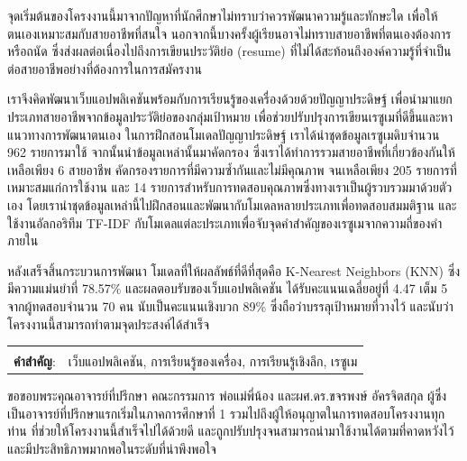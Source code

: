 \documentclass[12pt,oneside,openright,a4paper]{cpe-thai-project}
\begin{document}
\thaiabstract

จุดเริ่มต้นของโครงงานนี้มาจากปัญหาที่นักศึกษาไม่ทราบว่าควรพัฒนาความรู้และทักษะใด เพื่อให้ตนเองเหมาะสมกับสายอาชีพที่สนใจ 
นอกจากนี้บางครั้งผู้เรียนอาจไม่ทราบสายอาชีพที่ตนเองต้องการหรือถนัด ซึ่งส่งผลต่อเนื่องไปถึงการเขียนประวัติย่อ (resume) 
ที่ไม่ได้สะท้อนถึงองค์ความรู้ที่จำเป็นต่อสายอาชีพอย่างที่ต้องการในการสมัครงาน

เราจึงคิดพัฒนาเว็บแอปพลิเคชันพร้อมกับการเรียนรู้ของเครื่องด้วยด้วยปัญญาประดิษฐ์ เพื่อนำมาแยกประเภทสายอาชีพจากข้อมูลประวัติย่อของกลุ่มเป้าหมาย 
เพื่อช่วยปรับปรุงการเขียนเรซูเมที่ดีขึ้นและหาแนวทางการพัฒนาตนเอง ในการฝึกสอนโมเดลปัญญาประดิษฐ์ เราได้นำชุดข้อมูลเรซูเมดิบจำนวน 962 รายการมาใช้ 
จากนั้นนำข้อมูลเหล่านั้นมาคัดกรอง ซึ่งเราได้ทำการรวมสายอาชีพที่เกี่ยวข้องกันให้เหลือเพียง 6 สายอาชีพ คัดกรองรายการที่มีความซ้ำกันและไม่มีคุณภาพ 
จนเหลือเพียง 205 รายการที่เหมาะสมแก่การใช้งาน และ 14 รายการสำหรับการทดสอบคุณภาพซึ่งทางเราเป็นผู้รวบรวมมาด้วยตัวเอง 
โดยเรานำชุดข้อมูลเหล่านี้ไปฝึกสอนและพัฒนากับโมเดลหลายประเภทเพื่อทดสอบสมมติฐาน และใช้งานอัลกอริทึม TF-IDF 
กับโมเดลแต่ละประเภทเพื่อจับจุดคำสำคัญของเรซูเมจากความถี่ของคำภายใน

หลังเสร็จสิ้นกระบวนการพัฒนา โมเดลที่ให้ผลลัพธ์ที่ดีที่สุดคือ K-Nearest Neighbors (KNN) ซึ่งมีความแม่นยำที่ 78.57\% 
และผลตอบรับของเว็บแอปพลิเคชัน ได้รับคะแนนเฉลี่ยอยู่ที่ 4.47 เต็ม 5 จากผู้ทดสอบจำนวน 70 คน 
นับเป็นคะแนนเชิงบวก 89\% ซึ่งถือว่าบรรลุเป้าหมายที่วางไว้ และนับว่าโครงงานนี้สามารถทำตามจุดประสงค์ได้สำเร็จ

\begin{flushleft}
    \begin{tabular*}{\textwidth}{@{}lp{}}
        & \\

        \textbf{คำสำคัญ}: & เว็บแอปพลิเคชัน, การเรียนรู้ของเครื่อง, การเรียนรู้เชิงลึก, เรซูเม
    \end{tabular*}
\end{flushleft}
\endabstract


\preface
ขอขอบพระคุณอาจารย์ที่ปรึกษา คณะกรรมการ พ่อแม่พี่น้อง และผศ.ดร.ขจรพงษ์ อัครจิตสกุล ผู้ซึ่งเป็นอาจารย์ที่ปรึกษาแรกเริ่มในภาคการศึกษาที่ 1
รวมไปถึงผู้ให้อนุญาตในการทดสอบโครงงานทุกท่าน
ที่ช่วยให้โครงงานนี้สำเร็จไปได้ด้วยดี และถูกปรับปรุงจนสามารถนำมาใช้งานได้ตามที่คาดหวังไว้ และมีประสิทธิภาพมากพอในระดับที่น่าพึงพอใจ
\end{document}

